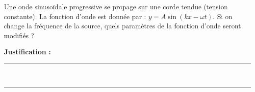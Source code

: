 Une onde sinusoïdale progressive se propage sur une corde tendue (tension constante). La fonction d'onde est donnée par : $y = A \sin(k x - \omega t)$. Si on change la fréquence de la source, quels paramètres de la fonction d'onde seront modifiés ?

\choices

\noindent\textbf{Justification :} \hrulefill \\[2.5ex]
\rule{\linewidth}{0.4pt} \\[2.5ex]
\rule{\linewidth}{0.4pt}
\vfill